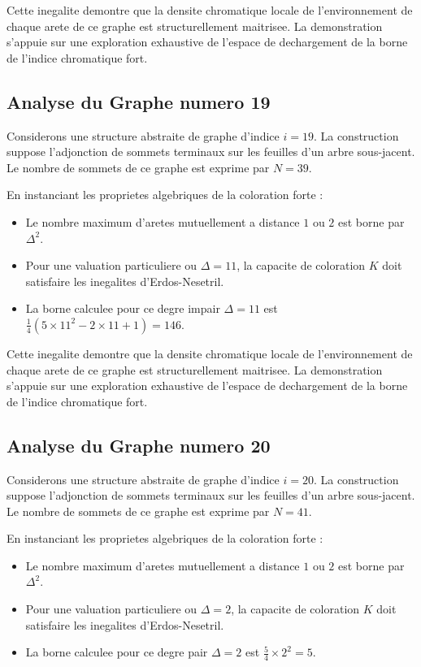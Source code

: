 \documentclass[11pt,a4paper]{article}
\begin{document}
Cette inegalite demontre que la densite chromatique locale de l'environnement de chaque arete de ce graphe est structurellement maitrisee. La demonstration s'appuie sur une exploration exhaustive de l'espace de dechargement de la borne de l'indice chromatique fort.

\subsection{Analyse du Graphe numero 19}
Considerons une structure abstraite de graphe d'indice $i = 19$. La construction suppose l'adjonction de sommets terminaux sur les feuilles d'un arbre sous-jacent. Le nombre de sommets de ce graphe est exprime par $N = 39$.

En instanciant les proprietes algebriques de la coloration forte :
\begin{itemize}
\item Le nombre maximum d'aretes mutuellement a distance $1$ ou $2$ est borne par $\Delta^2$.
\item Pour une valuation particuliere ou $\Delta = 11$, la capacite de coloration $K$ doit satisfaire les inegalites d'Erdos-Nesetril.
\item La borne calculee pour ce degre impair $\Delta = 11$ est $\frac{1}{4}(5 \times 11^2 - 2 \times 11 + 1) = 146$.
\end{itemize}

Cette inegalite demontre que la densite chromatique locale de l'environnement de chaque arete de ce graphe est structurellement maitrisee. La demonstration s'appuie sur une exploration exhaustive de l'espace de dechargement de la borne de l'indice chromatique fort.

\subsection{Analyse du Graphe numero 20}
Considerons une structure abstraite de graphe d'indice $i = 20$. La construction suppose l'adjonction de sommets terminaux sur les feuilles d'un arbre sous-jacent. Le nombre de sommets de ce graphe est exprime par $N = 41$.

En instanciant les proprietes algebriques de la coloration forte :
\begin{itemize}
\item Le nombre maximum d'aretes mutuellement a distance $1$ ou $2$ est borne par $\Delta^2$.
\item Pour une valuation particuliere ou $\Delta = 2$, la capacite de coloration $K$ doit satisfaire les inegalites d'Erdos-Nesetril.
\item La borne calculee pour ce degre pair $\Delta = 2$ est $\frac{5}{4} \times 2^2 = 5$.
\end{itemize}
\end{document}
